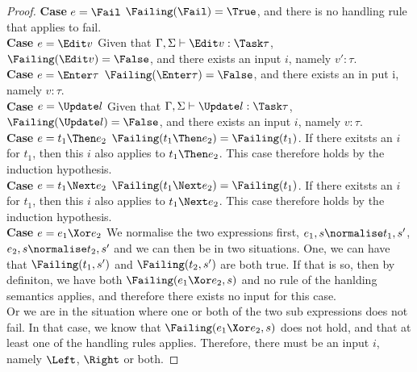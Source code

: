 \begin{proof}

  \noindent\textbf{Case} $e = \Fail$ $\Failing(\Fail)=\True$, and there is no handling rule that applies to fail.\\

  \noindent\textbf{Case} $e = \Edit v$ Given that $\Gamma,\Sigma\infers\Edit v:\Task\tau$, $\Failing(\Edit v)=\False$, and there exists an input $i$, namely $v':\tau$.\\

  \noindent\textbf{Case} $e = \Enter \tau$ $\Failing(\Enter \tau)=\False$, and there exists an in put i, namely $v:\tau$.\\

  \noindent\textbf{Case} $e = \Update l$ Given that $\Gamma,\Sigma\infers\Update l:\Task\tau$, $\Failing(\Update l)=\False$, and there exists an input $i$, namely $v:\tau$.\\

  \noindent\textbf{Case} $e = t_1\Then e_2$ $\Failing(t_1\Then e_2)=\Failing(t_1)$. If there exitsts an $i$ for $t_1$, then this $i$ also applies to $t_1\Then e_2$. This case therefore holds by the induction hypothesis.\\

  \noindent\textbf{Case} $e = t_1\Next e_2$ $\Failing(t_1\Next e_2)=\Failing(t_1)$. If there exitsts an $i$ for $t_1$, then this $i$ also applies to $t_1\Next e_2$. This case therefore holds by the induction hypothesis.\\

  \noindent\textbf{Case} $e = e_1\Xor e_2$ We normalise the two expressions first, $e_1,s\normalise t_1,s'$, $e_2,s\normalise t_2,s'$ and we can then be in two situations. One, we can have that $\Failing(t_1,s')$ and $\Failing(t_2,s')$ are both true. If that is so, then by definiton, we have both $\Failing(e_1\Xor e_2,s)$ and no rule of the hanlding semantics applies, and therefore there exists no input for this case.\\
                                           Or we are in the situation where one or both of the two sub expressions does not fail. In that case, we know that $\Failing(e_1\Xor e_2,s)$ does not hold, and that at least one of the handling rules applies. Therefore, there must be an input $i$, namely $\Left$, $\Right$ or both.


\end{proof}
